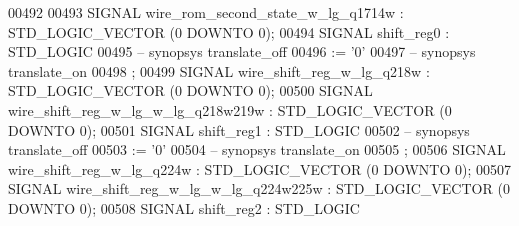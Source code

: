\begin{DoxyCode}
{00492 
00493      \textcolor{keywordflow}{SIGNAL}  \textcolor{vhdlchar}{wire_rom_second_state_w_lg_q1714w}  \textcolor{vhdlchar}{:}   \textcolor{comment}{STD\_LOGIC\_VECTOR} \textcolor{vhdlchar}{(}\textcolor{vhdllogic}{}\textcolor{vhdllogic}{0} \textcolor{keywordflow}{DOWNTO} \textcolor{vhdllogic}{}\textcolor{vhdllogic}{0}\textcolor{vhdlchar}{)};
00494      \textcolor{keywordflow}{SIGNAL}  \textcolor{vhdlchar}{shift_reg0} \textcolor{vhdlchar}{:}   \textcolor{comment}{STD\_LOGIC}
00495 \textcolor{keyword}{     -- synopsys translate\_off}
00496       \textcolor{vhdlchar}{:=} \textcolor{vhdlchar}{'}\textcolor{vhdllogic}{}\textcolor{vhdllogic}{0}\textcolor{vhdlchar}{'}
00497 \textcolor{keyword}{     -- synopsys translate\_on}
00498      ;
00499      \textcolor{keywordflow}{SIGNAL}  \textcolor{vhdlchar}{wire_shift_reg_w_lg_q218w}  \textcolor{vhdlchar}{:}   \textcolor{comment}{STD\_LOGIC\_VECTOR} \textcolor{vhdlchar}{(}\textcolor{vhdllogic}{}\textcolor{vhdllogic}{0} \textcolor{keywordflow}{DOWNTO} \textcolor{vhdllogic}{}\textcolor{vhdllogic}{0}\textcolor{vhdlchar}{)};
00500      \textcolor{keywordflow}{SIGNAL}  \textcolor{vhdlchar}{wire_shift_reg_w_lg_w_lg_q218w219w} \textcolor{vhdlchar}{:}   \textcolor{comment}{STD\_LOGIC\_VECTOR} \textcolor{vhdlchar}{(}\textcolor{vhdllogic}{}\textcolor{vhdllogic}{0} \textcolor{keywordflow}{DOWNTO} \textcolor{vhdllogic}{}\textcolor{vhdllogic}{0}\textcolor{vhdlchar}{)};
00501      \textcolor{keywordflow}{SIGNAL}  \textcolor{vhdlchar}{shift_reg1} \textcolor{vhdlchar}{:}   \textcolor{comment}{STD\_LOGIC}
00502 \textcolor{keyword}{     -- synopsys translate\_off}
00503       \textcolor{vhdlchar}{:=} \textcolor{vhdlchar}{'}\textcolor{vhdllogic}{}\textcolor{vhdllogic}{0}\textcolor{vhdlchar}{'}
00504 \textcolor{keyword}{     -- synopsys translate\_on}
00505      ;
00506      \textcolor{keywordflow}{SIGNAL}  \textcolor{vhdlchar}{wire_shift_reg_w_lg_q224w}  \textcolor{vhdlchar}{:}   \textcolor{comment}{STD\_LOGIC\_VECTOR} \textcolor{vhdlchar}{(}\textcolor{vhdllogic}{}\textcolor{vhdllogic}{0} \textcolor{keywordflow}{DOWNTO} \textcolor{vhdllogic}{}\textcolor{vhdllogic}{0}\textcolor{vhdlchar}{)};
00507      \textcolor{keywordflow}{SIGNAL}  \textcolor{vhdlchar}{wire_shift_reg_w_lg_w_lg_q224w225w} \textcolor{vhdlchar}{:}   \textcolor{comment}{STD\_LOGIC\_VECTOR} \textcolor{vhdlchar}{(}\textcolor{vhdllogic}{}\textcolor{vhdllogic}{0} \textcolor{keywordflow}{DOWNTO} \textcolor{vhdllogic}{}\textcolor{vhdllogic}{0}\textcolor{vhdlchar}{)};
00508      \textcolor{keywordflow}{SIGNAL}  \textcolor{vhdlchar}{shift_reg2} \textcolor{vhdlchar}{:}   \textcolor{comment}{STD\_LOGIC}
}
\end{DoxyCode}
